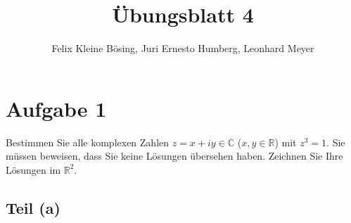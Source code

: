 \documentclass[11pt]{article}
\begin{document}
\title{Übungsblatt 4}
\author{Felix Kleine Bösing, Juri Ernesto Humberg, Leonhard Meyer}
\maketitle

\section*{Aufgabe 1}

Bestimmen Sie alle komplexen Zahlen \( z = x + iy \in \mathbb{C} \) (\( x, y \in \mathbb{R} \)) mit \( z^3 = 1 \). Sie müssen beweisen, dass Sie keine Lösungen übersehen haben. Zeichnen Sie Ihre Lösungen im \( \mathbb{R}^2 \).

\subsection*{Teil (a)}
\end{document}
